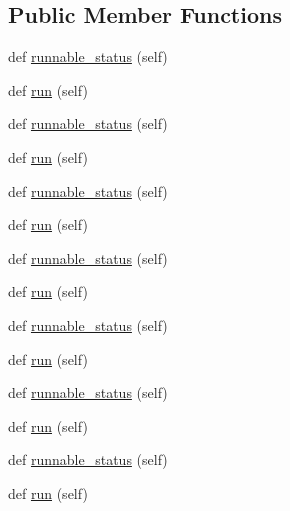 \subsection*{Public Member Functions}
\begin{DoxyCompactItemize}
\item 
def \hyperlink{classwaflib_1_1_tools_1_1waf__unit__test_1_1utest_aedc8f18c36eee11263ba8378b6e53b4f}{runnable\+\_\+status} (self)
\item 
def \hyperlink{classwaflib_1_1_tools_1_1waf__unit__test_1_1utest_aa278751a79cbc141887ef1bfbaca56f2}{run} (self)
\item 
def \hyperlink{classwaflib_1_1_tools_1_1waf__unit__test_1_1utest_aedc8f18c36eee11263ba8378b6e53b4f}{runnable\+\_\+status} (self)
\item 
def \hyperlink{classwaflib_1_1_tools_1_1waf__unit__test_1_1utest_aa278751a79cbc141887ef1bfbaca56f2}{run} (self)
\item 
def \hyperlink{classwaflib_1_1_tools_1_1waf__unit__test_1_1utest_aedc8f18c36eee11263ba8378b6e53b4f}{runnable\+\_\+status} (self)
\item 
def \hyperlink{classwaflib_1_1_tools_1_1waf__unit__test_1_1utest_aa278751a79cbc141887ef1bfbaca56f2}{run} (self)
\item 
def \hyperlink{classwaflib_1_1_tools_1_1waf__unit__test_1_1utest_aedc8f18c36eee11263ba8378b6e53b4f}{runnable\+\_\+status} (self)
\item 
def \hyperlink{classwaflib_1_1_tools_1_1waf__unit__test_1_1utest_aa278751a79cbc141887ef1bfbaca56f2}{run} (self)
\item 
def \hyperlink{classwaflib_1_1_tools_1_1waf__unit__test_1_1utest_aedc8f18c36eee11263ba8378b6e53b4f}{runnable\+\_\+status} (self)
\item 
def \hyperlink{classwaflib_1_1_tools_1_1waf__unit__test_1_1utest_aa278751a79cbc141887ef1bfbaca56f2}{run} (self)
\item 
def \hyperlink{classwaflib_1_1_tools_1_1waf__unit__test_1_1utest_aedc8f18c36eee11263ba8378b6e53b4f}{runnable\+\_\+status} (self)
\item 
def \hyperlink{classwaflib_1_1_tools_1_1waf__unit__test_1_1utest_aa278751a79cbc141887ef1bfbaca56f2}{run} (self)
\item 
def \hyperlink{classwaflib_1_1_tools_1_1waf__unit__test_1_1utest_aedc8f18c36eee11263ba8378b6e53b4f}{runnable\+\_\+status} (self)
\item 
def \hyperlink{classwaflib_1_1_tools_1_1waf__unit__test_1_1utest_aa278751a79cbc141887ef1bfbaca56f2}{run} (self)

\end{DoxyCompactItemize}
